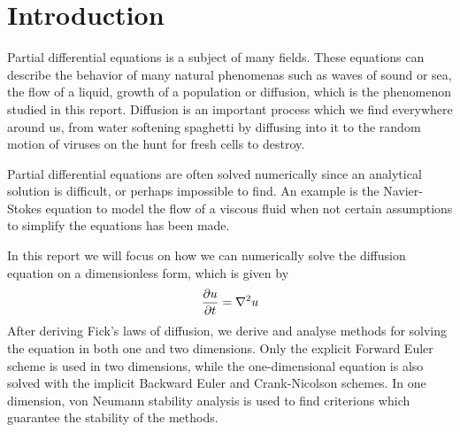 \section{Introduction}
Partial differential equations is a subject of many fields. These equations can describe the behavior of many natural phenomenas such as waves of sound or sea, the flow of a liquid, growth of a population or diffusion, which is the phenomenon studied in this report. Diffusion is an important process which we find everywhere around us, from water softening spaghetti by diffusing into it to the random motion of viruses on the hunt for fresh cells to destroy.

Partial differential equations are often solved numerically since an analytical solution is difficult, or perhaps impossible to find. An example is the Navier-Stokes equation to model the flow of a viscous fluid when not certain assumptions to simplify the equations has been made.

In this report we will focus on how we can numerically solve the diffusion equation on a dimensionless form, which is given by
\begin{equation}\label{eq:diffusion}
\begin{aligned}
\pdv{u}{t} = \nabla^2 u
\end{aligned}
\end{equation}
After deriving Fick's laws of diffusion, we derive and analyse methods for solving the equation in both one and two dimensions. Only the explicit Forward Euler scheme is used in two dimensions, while the one-dimensional equation is also solved with the implicit Backward Euler and Crank-Nicolson schemes. In one dimension, von Neumann stability analysis is used to find criterions which guarantee the stability of the methods.
